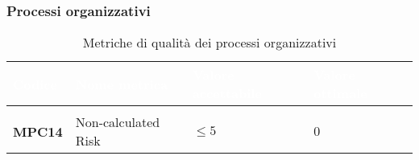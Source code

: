 \subsubsection{Processi organizzativi}

{
\renewcommand{\arraystretch}{1.5}
\centering
\begin{longtable}{C{2.5cm} | C{5.5cm} | C{3.5cm} | C{3.5cm}}
\textcolor{white}{\textbf{Codice}}&
\textcolor{white}{\textbf{Nome metrica}}&
\textcolor{white}{\textbf{Valore accettabile}}&
\textcolor{white}{\textbf{Valore ottimale}}\\	

\endhead
\endfoot
{}\caption{Metriche di qualità dei processi organizzativi}
\endlastfoot

 \\

\textbf{MPC14} & Non-calculated Risk & $ \leq 5 $ & $ 0 $ \\
\end{longtable}
}